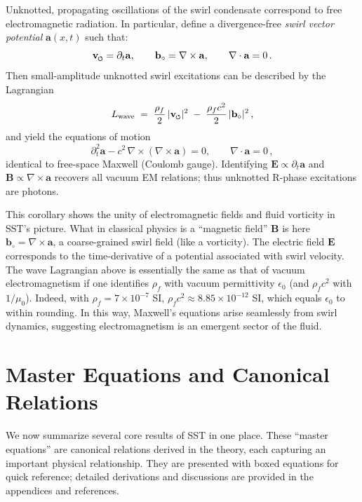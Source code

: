 \documentclass[reprint,aps,onecolumn,nofootinbib]{revtex4-2}
\newcommand{\swirlarrow}{%
    \mathchoice{\mkern-2mu\scriptstyle\boldsymbol{\circlearrowleft}}%
    {\mkern-2mu\scriptstyle\boldsymbol{\circlearrowleft}}%
    {\mkern-2mu\scriptscriptstyle\boldsymbol{\circlearrowleft}}%
    {\mkern-2mu\scriptscriptstyle\boldsymbol{\circlearrowleft}}%
}
\newcommand{\vswirl}{\mathbf{v}_{\swirlarrow}}
\begin{document}
	\begin{tcolorbox}[title=Corollary 4.2: Photon as a Swirl Wave]
		Unknotted, propagating oscillations of the swirl condensate correspond to free electromagnetic radiation. In particular, define a divergence-free \emph{swirl vector potential} $\mathbf{a}(x,t)$ such that:
		\[
			\vswirl = \partial_t \mathbf{a}, \qquad
			\mathbf{b}_{\circ} = \nabla \times \mathbf{a}, \qquad
			\nabla\cdot \mathbf{a} = 0\,.
		\]
		Then small-amplitude unknotted swirl excitations can be described by the Lagrangian
		\[
			L_{\text{wave}} \;=\; \frac{\rho_f}{2}\,|\vswirl|^2 \;-\; \frac{\rho_f c^2}{2}\,|\mathbf{b}_{\circ}|^2\,,
		\]
		and yield the equations of motion
		\[
			\partial_t^2 \mathbf{a} - c^2 \,\nabla \times (\nabla \times \mathbf{a}) = 0, \qquad \nabla \cdot \mathbf{a} = 0\,,
		\]
		identical to free-space Maxwell (Coulomb gauge). Identifying $\mathbf{E} \propto \partial_t \mathbf{a}$ and $\mathbf{B}\propto \nabla \times \mathbf{a}$ recovers all vacuum EM relations; thus unknotted R-phase excitations are photons.
	\end{tcolorbox}

	\noindent This corollary shows the unity of electromagnetic fields and fluid vorticity in SST’s picture. What in classical physics is a “magnetic field” $\mathbf{B}$ is here $\mathbf{b}_{\circ} = \nabla\times \mathbf{a}$, a coarse-grained swirl field (like a vorticity). The electric field $\mathbf{E}$ corresponds to the time-derivative of a potential associated with swirl velocity. The wave Lagrangian above is essentially the same as that of vacuum electromagnetism if one identifies $\rho_f$ with vacuum permittivity $\epsilon_0$ (and $\rho_f c^2$ with $1/\mu_0$). Indeed, with $\rho_f = 7\times10^{-7}$ SI, $\rho_f c^2 \approx 8.85\times10^{-12}$ SI, which equals $\epsilon_0$ to within rounding. In this way, Maxwell’s equations arise seamlessly from swirl dynamics, suggesting electromagnetism is an emergent sector of the fluid.



    \section{Master Equations and Canonical Relations}
        We now summarize several core results of SST in one place. These “master equations” are canonical relations derived in the theory, each capturing an important physical relationship. They are presented with boxed equations for quick reference; detailed derivations and discussions are provided in the appendices and references.
\end{document}
